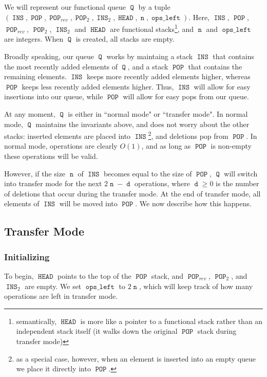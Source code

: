 \documentclass[12.5pt]{scrartcl}
\DeclareMathOperator{\INS}{\mathtt{INS}}
\DeclareMathOperator{\POP}{\mathtt{POP}}
\DeclareMathOperator{\HEAD}{\mathtt{HEAD}}
\DeclareMathOperator{\opsleft}{\mathtt{ops\_left}}
\DeclareMathOperator{\n}{\mathtt{n}}
\DeclareMathOperator{\dd}{\mathtt{d}}
\DeclareMathOperator{\Q}{\mathtt{Q}}
\begin{document}
We will represent our functional queue $\Q$ by a tuple $(\INS, \POP, \POP_{rev}, \POP_2, \INS_2,\HEAD, \n, \opsleft)$. Here, $\INS$, $\POP$, $\POP_{rev}$, $\POP_2$, $\INS_2$ and $\HEAD$ are functional stacks\footnote{semantically, $\HEAD$ is more like a pointer to a functional stack rather than an independent stack itself (it walks down the original $\POP$ stack during transfer mode)}, and $\n$ and $\opsleft$ are integers. When $\Q$ is created, all stacks are empty. 

Broadly speaking, our queue $\Q$ works by maintaing a stack $\INS$ that contains the most recently added elements of $\Q$, and a stack $\POP$ that contains the remaining elements. $\INS$ keeps more recently added elements higher, whereas $\POP$ keeps less recently added elements higher. Thus, $\INS$ will allow for easy insertions into our queue, while $\POP$ will allow for easy pops from our queue. 

At any moment, $\Q$ is either in ``normal mode" or ``transfer mode". In normal mode, $\Q$ maintains the invariants above, and does not worry about the other stacks: inserted elements are placed into $\INS$\footnote{as a special case, however, when an element is inserted into an empty queue we place it directly into $\POP$.}, and deletions pop from $\POP$. In normal mode, operations are clearly $O(1)$, and as long as $\POP$ is non-empty these operations will be valid. 

However, if the size $\n$ of $\INS$ becomes equal to the size of $\POP$, $\Q$ will switch into transfer mode for the next $2\n - \dd$ operations, where $\dd \geq 0$ is the number of deletions that occur during the transfer mode. At the end of transfer mode, all elements of $\INS$ will be moved into $\POP$. We now describe how this happens. 

\subsection{Transfer Mode}

\subsubsection{Initializing} To begin, $\HEAD$ points to the top of the $\POP$ stack, and $\POP_{rev}$, $\POP_2$, and $\INS_2$ are empty. We set $\opsleft$ to $2\n$, which will keep track of how many operations are left in transfer mode.
\end{document}
